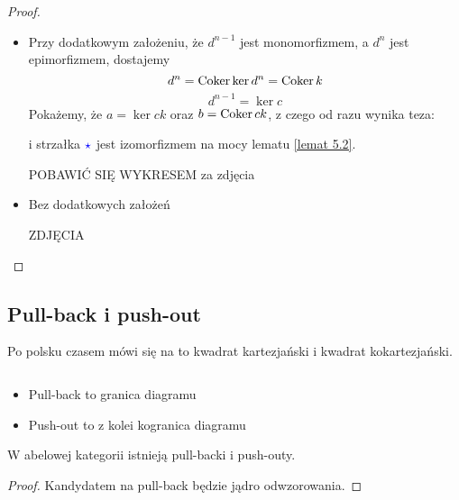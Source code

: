 \begin{proof}
  \begin{itemize}
    \item Przy dodatkowym założeniu, że $d^{n-1}$ jest monomorfizmem, a $d^n$ jest epimorfizmem, dostajemy
  $$d^n=\operatorname{Coker}\ker d^n=\operatorname{Coker} k$$
  $$d^{n-1}=\ker c$$
  Pokażemy, że $a=\ker ck$ oraz $b=\operatorname{Coker} ck$, z czego od razu wynika teza:
  \begin{center}\end{center}
  i strzałka $\color{blue}\star$ jest izomorfizmem na mocy lematu \ref{lemat 5.2}.

  {\large\color{red}POBAWIĆ SIĘ WYKRESEM za zdjęcia}

  \item Bez dodatkowych założeń

    {\large\color{red}ZDJĘCIA}
\end{itemize}

\end{proof}

\subsection{Pull-back i push-out}

Po polsku czasem mówi się na to kwadrat kartezjański i kwadrat kokartezjański.

\begin{definition}$ $\newline
  \begin{itemize}
    \item Pull-back to granica diagramu
      \begin{center}\end{center}
    \item Push-out to z kolei kogranica diagramu
      \begin{center}\end{center}
  \end{itemize}
\end{definition}

\begin{fact}
  W abelowej kategorii istnieją pull-backi i push-outy.
\end{fact}

\begin{proof}
  Kandydatem na pull-back będzie jądro odwzorowania.
\end{proof}


